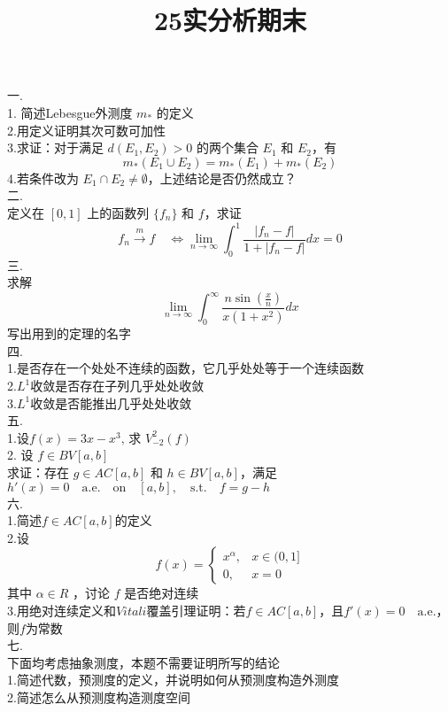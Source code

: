 \documentclass[UTF8]{ctexart}
\title{25实分析期末}
\author{}
\date{}
\begin{document}
\maketitle
\noindent 一.\\
1. 简述Lebesgue外测度 \( m_*\) 的定义\\
2.用定义证明其次可数可加性\\
3.求证：对于满足 \( d(E_1, E_2) > 0 \) 的两个集合 \( E_1 \) 和 \( E_2 \)，有
$$ m_*(E_1 \cup E_2) = m_*(E_1) + m_*(E_2)$$
4.若条件改为 \( E_1 \cap E_2 \neq \emptyset \)，上述结论是否仍然成立？\\
二.\\
定义在 $[0,1]$ 上的函数列 $\{f_n\}$ 和 $f$，求证
\[
f_n \xrightarrow{m} f \quad \Longleftrightarrow \lim _{n \rightarrow \infty} \int_0^1 \frac{\left|f_n-f\right|}{1+\left|f_n-f\right|} d x=0
\]
三.\\
求解
$$\lim _{n \rightarrow \infty} \int_0^{\infty} \frac{n \sin \left(\frac{x}{n}\right)}{x\left(1+x^2\right)} d x$$
写出用到的定理的名字\\
四.\\
1.是否存在一个处处不连续的函数，它几乎处处等于一个连续函数\\
2.$L^1$收敛是否存在子列几乎处处收敛\\
3.$L^1$收敛是否能推出几乎处处收敛\\
五.\\
1.设$f(x)=3 x-x^3 \text {, 求  } V_{-2}^2(f)$\\
2. 设 $f \in BV[a, b]$\\
求证：存在 $g \in AC[a, b]$ 和 $h \in BV[a, b]$，满足$h'(x) = 0 \quad \text{a.e.}\quad \text{on} \quad[a, b], \quad \text{s.t.} \quad f = g - h$\\
六.\\
1.简述$f \in AC[a, b]$的定义\\
2.设 $$f(x)=\left\{\begin{array}{cc}x^\alpha, & x \in(0,1] \\ 0, & x=0\end{array}\right.$$
其中 $\alpha \in R$ ，讨论 $f$ 是否绝对连续\\
3.用绝对连续定义和$Vitali$覆盖引理证明：若$f \in AC[a, b]$，且$f'(x) = 0 \quad \text{a.e.}$，则$f$为常数\\
七.\\
下面均考虑抽象测度，本题不需要证明所写的结论\\
1.简述代数，预测度的定义，并说明如何从预测度构造外测度\\
2.简述怎么从预测度构造测度空间\\
\end{document}
